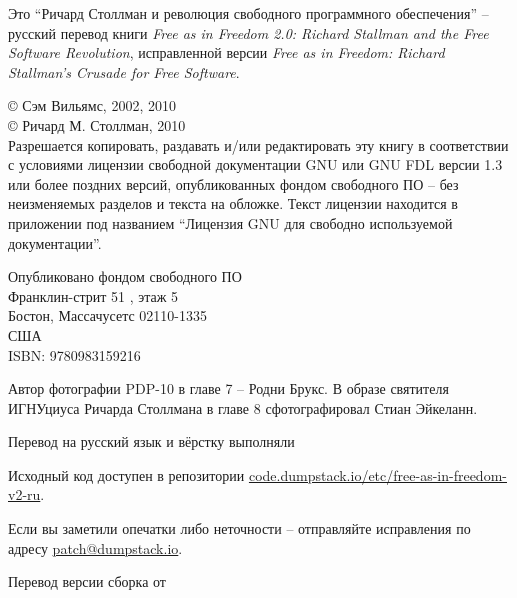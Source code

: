 \thispagestyle{plain}

\noindent Это \enquote{Ричард Столлман и революция свободного программного обеспечения} -- русский перевод книги \textit{Free as in Freedom 2.0: Richard Stallman and the Free Software Revolution}, исправленной версии \textit{Free as in Freedom: Richard Stallman's Crusade for Free Software}.

\bigskip

\noindent \copyright{} Сэм Вильямс, 2002, 2010\\
\copyright{} Ричард М. Столлман, 2010\\

Разрешается копировать, раздавать и/или редактировать эту книгу в соответствии с условиями лицензии свободной документации GNU или GNU FDL версии 1.3 или более поздних версий, опубликованных фондом свободного ПО -- без неизменяемых разделов и текста на обложке. Текст лицензии находится в приложении под названием \enquote{Лицензия GNU для свободно используемой документации}.

\bigskip

\noindent Опубликовано фондом свободного ПО\\
Франклин-стрит 51 , этаж 5\\
Бостон, Массачусетс 02110-1335\\
США\\
ISBN: 9780983159216\\

\bigskip

\noindent Автор фотографии PDP-10 в главе 7 -- Родни Брукс. В образе святителя ИГНУциуса Ричарда Столлмана в главе 8 сфотографировал Стиан Эйкеланн.

\bigskip

Перевод на русский язык и вёрстку выполняли 

Исходный код доступен в репозитории
\href{https://code.dumpstack.io/etc/free-as-in-freedom-v2-ru}{code.dumpstack.io/etc/free-as-in-freedom-v2-ru}.

Если вы заметили опечатки либо неточности -- отправляйте исправления по адресу
\href{mailto:patch@dumpstack.io}{patch@dumpstack.io}.

Перевод версии  сборка от 

\theendnotes
\setcounter{endnote}{0}
